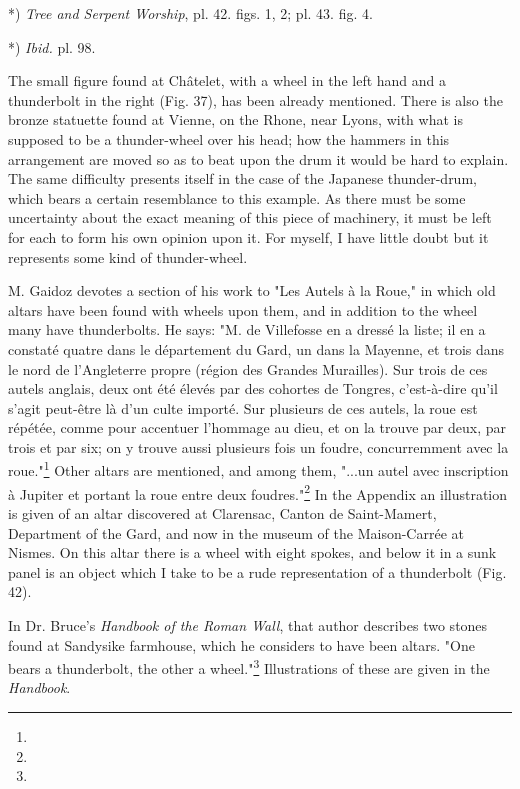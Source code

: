 \documentclass[a4paper, 11pt, oneside, polutonikogreek, english]{article}
\begin{document}
*) \emph{Tree and Serpent Worship}, pl. 42. figs. 1, 2; pl. 43. fig. 4.

*) \emph{Ibid.} pl. 98.

The small figure found at Châtelet, with a wheel in the left hand and a thunderbolt in the right (Fig. 37), has been already mentioned. There is also the bronze statuette found at Vienne, on the Rhone, near Lyons, with what is supposed to be a thunder-wheel over his head; how the hammers in this arrangement are moved so as to beat upon the drum it would be hard to explain. The same difficulty presents itself in the case of the Japanese thunder-drum, which bears a certain resemblance to this example. As there must be some uncertainty about the exact meaning of this piece of machinery, it must be left for each to form his own opinion upon it. For myself, I have little doubt but it represents some kind of thunder-wheel.

M. Gaidoz devotes a section of his work to "Les Autels à la Roue," in which old altars have been found with wheels upon them, and in addition to the wheel many have thunderbolts. He says: "M. de Villefosse en a dressé la liste; il en a constaté quatre dans le département du Gard, un dans la Mayenne, et trois dans le nord de l'Angleterre propre (région des Grandes Murailles). Sur trois de ces autels anglais, deux ont été élevés par des cohortes de Tongres, c'est-à-dire qu'il s'agit peut-être là d'un culte importé. Sur plusieurs de ces autels, la roue est répétée, comme pour accentuer l'hommage au dieu, et on la trouve par deux, par trois et par six; on y trouve aussi plusieurs fois un foudre, concurremment avec la roue."\footnote{} Other altars are mentioned, and among them, "...un autel avec inscription à Jupiter et portant la roue entre deux foudres."\footnote{} In the Appendix an illustration is given of an altar discovered at Clarensac, Canton de Saint-Mamert, Department of the Gard, and now in the museum of the Maison-Carrée at Nismes. On this altar there is a wheel with eight spokes, and below it in a sunk panel is an object which I take to be a rude representation of a thunderbolt (Fig. 42).

In Dr. Bruce's \emph{Handbook of the Roman Wall}, that author describes two stones found at Sandysike farmhouse, which he considers to have been altars. "One bears a thunderbolt, the other a wheel."\footnote{} Illustrations of these are given in the \emph{Handbook}.
\end{document}
